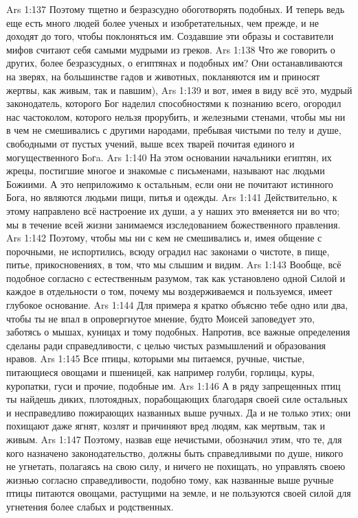 \vs Ars 1:137
Поэтому тщетно и безразсудно обоготворять подобных. И теперь ведь еще есть много людей более ученых и изобретательных, чем прежде, и не доходят до того, чтобы поклоняться им. Создавшие эти образы и составители мифов считают себя самыми мудрыми из греков.
\vs Ars 1:138
Что же говорить о других, более безразсудных, о египтянах и подобных им? Они останавливаются на зверях, на большинстве гадов и животных, покланяются им и приносят жертвы, как живым, так и павшим),
\vs Ars 1:139
и вот, имея в виду всё это, мудрый законодатель, которого Бог наделил способностями к познанию всего, огородил нас частоколом, которого нельзя прорубить, и железными стенами, чтобы мы ни в чем не смешивались с другими народами, пребывая чистыми по телу и душе, свободными от пустых учений, выше всех тварей почитая единого и могущественного Бoгa.
\vs Ars 1:140
На этом основании начальники египтян, их жрецы, постигшие многое и знакомые с письменами, называют нас людьми Божиими. А это неприложимо к остальным, если они не почитают истинного Бога, но являются людьми пищи, питья и одежды.
\vs Ars 1:141
Действительно, к этому направлено всё настроение их души, а у наших это вменяется ни во что; мы в течение всей жизни занимаемся изследованием божественного правления.
\vs Ars 1:142
Поэтому, чтобы мы ни с кем не смешивались и, имея общение с порочными, не испортились, всюду оградил нас законами о чистоте, в пище, питье, прикосновениях, в том, что мы слышим и видим.
\vs Ars 1:143
Вообще, всё подобное согласно с естественным разумом, так как установлено одной Силой и каждое в отдельности о том, почему мы воздерживаемся и пользуемся, имеет глубокое основание.
\vs Ars 1:144
Для примера я кратко объясню тебе одно или два, чтобы ты не впал в опровергнутое мнение, будто Моисей заповедует это, заботясь о мышах, куницах и тому подобных. Напротив, все важные определения сделаны ради справедливости, с целью чистых размышлений и образования нравов.
\vs Ars 1:145
Все птицы, которыми мы питаемся, ручные, чистые, питающиеся овощами и пшеницей, как например голуби, горлицы, куры, куропатки, гуси и прочие, подобные им.
\vs Ars 1:146
А в ряду запрещенных птиц ты найдешь диких, плотоядных, порабощающих благодаря своей силе остальных и несправедливо пожирающих названных выше ручных. Да и не только этих; они похищают даже ягнят, козлят и причиняют вред людям, как мертвым, так и живым.
\vs Ars 1:147
Поэтому, назвав еще нечистыми, обозначил этим, что те, для кого назначено законодательство, должны быть справедливыми по душе, никого не угнетать, полагаясь на свою силу, и ничего не похищать, но управлять своею жизнью согласно справедливости, подобно тому, как названные выше ручные птицы питаются овощами, растущими на земле, и не пользуются своей силой для угнетения более слабых и родственных.
